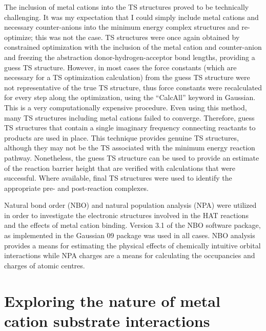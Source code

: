 \begin{doublespace}
The inclusion of metal cations into the TS structures proved to be technically
challenging. It was my expectation that I could simply include metal cations and
necessary counter-anions into the minimum energy complex structures and
re-optimize; this was not the case. TS structures were once again
obtained by constrained optimization with the inclusion of the metal cation and
counter-anion and freezing the abstraction donor-hydrogen-acceptor bond lengths,
providing a guess TS structure. However, in most cases the force constants
(which are necessary for a TS optimization calculation) from the guess TS
structure were not representative of the true TS structure, thus force constants
were recalculated for every step along the optimization, using the ``CalcAll''
keyword in Gaussian. This is a very computationally expensive procedure. Even
using this method, many TS structures including metal cations failed to
converge. Therefore, guess TS structures that contain a single imaginary
frequency connecting reactants to products are used in place. This technique
provides genuine TS structures, although they may not be the TS associated with
the minimum energy reaction pathway. Nonetheless, the guess TS structure can be
used to provide an estimate of the reaction barrier height that are verified
with calculations that were successful. Where available, final TS structures
were used to identify the appropriate pre- and post-reaction complexes.

Natural bond order (NBO) and natural population analysis (NPA) were utilized in
order to investigate the electronic structures involved in the HAT reactions and
the effects of metal cation binding.\cite{Reed1983, Reed1985, Glendening2012}
Version 3.1 of the NBO software package,\cite{NBO3} as implemented in the
Gaussian 09 package was used in all cases.\cite{Frisch2009} NBO analysis
provides a means for estimating the physical effects of chemically intuitive
orbital interactions while NPA charges are a means for calculating the
occupancies and charges of atomic centres.\cite{Landis2014, Weinhold2016}

\section{Exploring the nature of metal cation substrate interactions}


\end{doublespace}

